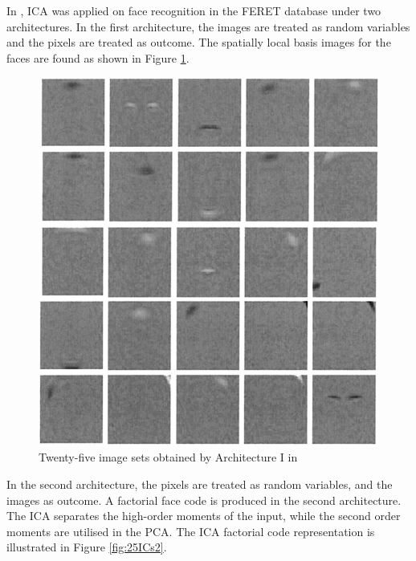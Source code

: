 In \cite{Bartlett2002}, ICA was applied on face recognition in the \mbox{FERET} database under two architectures. In the first architecture, the images are treated as random variables and the pixels are treated as outcome. The spatially local basis images for the faces are found as shown in \mbox{Figure} \ref{fig:25ICs1}.
\begin{figure}[t]
 \begin{center}
  \includegraphics[width=0.7\columnwidth]{ch2/figures/25ICsArch1.jpg}
  \caption{Twenty-five image sets obtained by Architecture I in \cite{Bartlett2002}}
  \label{fig:25ICs1}
 \end{center}
\end{figure} 
In the second architecture, the pixels are treated as random variables, and the images as outcome. A factorial face code is produced in the second architecture. The ICA separates the high-order moments of the input, while the second order moments are utilised in the PCA. The ICA factorial code representation is illustrated in \mbox{Figure} \ref{fig:25ICs2}.
